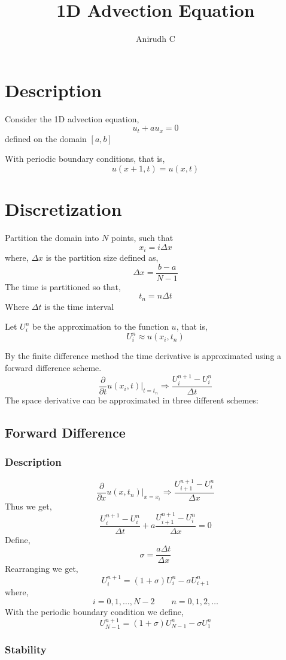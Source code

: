 \documentclass[11pt]{article}
\author{Anirudh C}
\date{}
\title{1D Advection Equation}
\begin{document}
\maketitle
\tableofcontents

\section{Description}
\label{sec:org8c9138a}
Consider the 1D advection equation,
$$u_t + a u_x = 0$$
defined on the domain \([a,b]\)

With periodic boundary conditions, that is,
$$u(x+1,t) = u(x,t)$$
\section{Discretization}
\label{sec:org0e06e03}
Partition the domain into \(N\) points, such that
$$x_i = i \Delta x$$
where, \(\Delta x\) is the partition size defined as,
$$\Delta x = \frac{b - a}{N-1}$$
The time is partitioned so that,
$$t_n = n \Delta t$$
Where \(\Delta t\) is the time interval

Let \(U_i^n\) be the approximation to the function \(u\), that is,
$$U_i^n \approx u(x_i,t_n)$$

By the finite difference method the time derivative is approximated using a forward difference scheme.
$$\frac{\partial}{\partial t} u(x_i,t) \bigg|_{t=t_n} \Rightarrow \frac{U_i^{n+1} - U_i^n}{\Delta t}$$
The space derivative can be approximated in three different schemes:
\subsection{Forward Difference}
\label{sec:orge13d726}
\subsubsection{Description}
\label{sec:org8831cc7}
$$\frac{\partial}{\partial x} u(x,t_n) \bigg|_{x=x_i} \Rightarrow \frac{U_{i+1}^{n+1} - U_i^n}{\Delta x}$$
Thus we get,
$$\frac{U_i^{n+1} - U_i^n}{\Delta t} + a \frac{U_{i+1}^{n+1} - U_i^n}{\Delta x} = 0$$
Define,
$$\sigma = \frac{a \Delta t}{\Delta x}$$
Rearranging we get,
$$U_i^{n+1} = \left( 1 + \sigma \right) U_i^n - \sigma U_{i+1}^n$$
where,
$$i=0,1,\ldots,N-2 \qquad n = 0,1,2,\ldots$$
With the periodic boundary condition we define,
$$U_{N-1}^{n+1} = \left( 1 + \sigma \right) U_{N-1}^n - \sigma U_{1}^n$$
\subsubsection{Stability}
\label{sec:org7ad4011}
\end{document}
